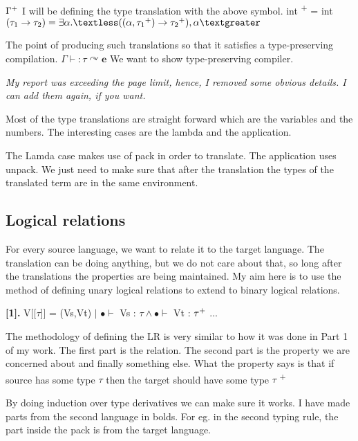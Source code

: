 \documentclass[10pt]{article}
\begin{document}
  $\Gamma \textsuperscript{+}$
  \vskip 0.2in
  I will be defining the type translation with the above symbol. 
  \vskip 0.2in
  int \textsuperscript{+} = int
  \vskip 0.1in
  $( \tau_1 \rightarrow \tau_2) = \exists \alpha. \textless((\alpha, \tau_1 \textsuperscript{+}) \rightarrow \tau_2 \textsuperscript{+}), \alpha \textgreater $
  
  \vskip 0.2in
  The point of producing such translations so that it satisfies a type-preserving compilation. 
  \vskip 0.2in
  $\Gamma \vdash : \tau \curvearrowright \textbf{e}$
  \vskip 0.2in
  We want to show type-preserving compiler. 
  
  \vskip 0.3in
  
  \textit{My report was exceeding the page limit, hence, I removed some obvious details. I can add them again, if you want.   }
  \vskip 0.2in
  
  Most of the type translations are straight forward which are the variables and the numbers. The interesting cases are the lambda and the application. 
  
 The Lamda case makes use of pack in order to translate. The application uses unpack. We just need to make sure that after the translation the types of the translated term are in the same environment. 
  
  
  \subsection{Logical relations}
  For every source language, we want to relate it to the target language. The translation can be doing anything, but we do not care about that, so long after the translations the properties are being maintained. 
  \vskip 0.2in
  My aim here is to use the method of defining unary logical relations to extend to binary logical relations. 
  
  \vskip 0.2in
\textbf{[1]. }V[[$\tau$]] = { (Vs,Vt) $\lvert$ $\bullet \vdash$ Vs : $\tau \wedge \bullet \vdash$ Vt : $\tau \textsuperscript{+}$ ...}
   
   \vskip 0.2in
   The methodology of defining the LR is very similar to how it was done in Part 1 of my work. 
   \vskip 0.1in
   The first part is the relation. The second part is the property we are concerned about and finally something else. 
   What the property says is that if source has some type $\tau$ then the target should have some type $\tau$ \textsuperscript{+}
   
   \vskip 0.2in
 By doing induction over type derivatives we can make sure it works.
 I have made parts from the second language in bolds. For eg. in the second typing rule, the part inside the pack is from the target language. 
 \vskip 0.2in
 
\end{document}
